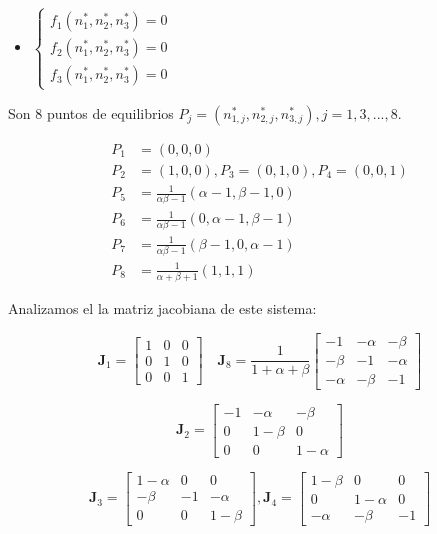 \documentclass[twocolumn,aps,prl]{revtex4-1}
\newcommand{\nstar}{n^*}
\begin{document}
\begin{itemize}\centering
    \item[] 
    $\left\lbrace
    \begin{aligned}
        f_1(\nstar_1,\nstar_2,\nstar_3) = 0\\ 
        f_2(\nstar_1,\nstar_2,\nstar_3) = 0\\ 
        f_3(\nstar_1,\nstar_2,\nstar_3) = 0   
    \end{aligned}\right.
    $
\end{itemize}


Son 8 puntos de equilibrios $P_j = (\nstar_{1,j},\nstar_{2,j},\nstar_{3,j}), j= 1, 3, ..., 8$.

$$
\begin{aligned}
    P_1 &= (0, 0, 0) \\ 
    P_2 &= (1, 0, 0), P_3 = (0, 1, 0), P_4 = (0, 0, 1) \\
    P_5 &= \frac{1}{\alpha \beta - 1} 
                       (\alpha - 1, \beta - 1 , 0) \\ 
    P_6 &= \frac{1}{\alpha \beta - 1} 
                       (0         , \alpha - 1, \beta - 1) \\ 
    P_7 &= \frac{1}{\alpha \beta - 1} 
                       (\beta - 1 , 0         , \alpha - 1) \\ 
    P_8 &= \frac{1}{\alpha + \beta + 1}(1, 1, 1) 
\end{aligned}
$$

Analizamos el la matriz jacobiana de este sistema:

$$
\mathbf{J}_1 = 
\begin{bmatrix}
    1  & 0 & 0 \\
    0 & 1 & 0 \\
    0 & 0 & 1
\end{bmatrix}
\quad 
\mathbf{J}_8 = 
\frac{1}{1+\alpha+\beta}\begin{bmatrix}
    -1 & -\alpha & -\beta \\
    -\beta & -1 & -\alpha \\
    -\alpha & -\beta & -1
\end{bmatrix}
$$

$$
\mathbf{J}_2 = 
\begin{bmatrix}
    -1 & - \alpha & - \beta \\
    0 & 1-\beta & 0 \\
    0 & 0 & 1- \alpha
\end{bmatrix}
$$

$$
\mathbf{J}_3 = 
\begin{bmatrix}
    1 - \alpha  & 0 & 0 \\
    - \beta & -1 & - \alpha \\
    0 & 0 & 1  - \beta
\end{bmatrix}
,
\mathbf{J}_4 = 
\begin{bmatrix}
    1 - \beta  & 0 & 0 \\
    0 & 1 -\alpha  & 0 \\
    - \alpha  & -\beta & -1
\end{bmatrix}
$$
\end{document}
